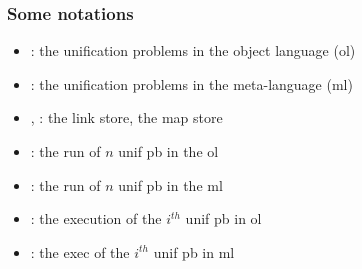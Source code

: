 \documentclass{pres}
\begin{document}
\def\llam{\ensuremath{{\mathcal{L}_\lambda}}\xspace}
\begin{frame}
  \frametitle{Some notations}

  \begin{itemize}
    \item \foUnifPb: the unification problems in the object language (ol)
    \item \hoUnifPb: the unification problems in the meta-language (ml)
    \item \linkStore, \mapStore: the link store, the map store
  \end{itemize}

  \mysep

  \begin{itemize}
    \item {}: the run of $n$ unif pb in the ol
    \item {}: the run of $n$ unif pb in the ml
    \item {}: the execution of the $i^{th}$ unif pb in ol
    \item {}: the exec of the $i^{th}$ unif pb in ml
  \end{itemize}


\end{frame}
\end{document}
